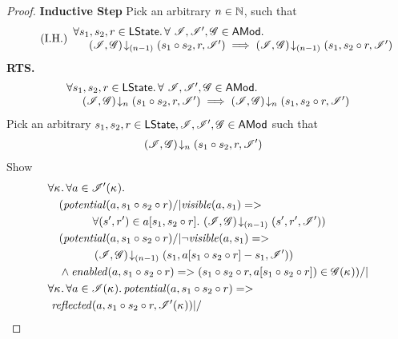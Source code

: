 \begin{lemma}
\begin{proof}
\noindent\textbf{Inductive Step} Pick an arbitrary $n \in \mathbb{N}$, such that
%
\begin{equation}
	\tag{I.H.}
%
	\begin{array}{l}
		\for{s_1, s_2, r \in \LStates} \for{\ \lmod, \lmod', \gmod \in \AMods}\\
		\hspace*{0.5cm} \extendsAMUpto{\lmod, \gmod}{(n-1)}{s_1 \composeL s_2}{r}{\lmod'} \implies 
										\extendsAMUpto{\lmod, \gmod}{(n-1)}{s_1}{s_2 \composeL r}{\lmod'}
	\end{array}
%
\label{LCS:IH}
\end{equation}
%
\textbf{RTS. }
%
\[
\begin{array}{l}
	\forall s_1, s_2, r \in \textsf{LState}.\, \forall \ \mathscr{I}, \mathscr{I}', \mathscr{G} \in \textsf{AMod}.\,\\
	\hspace*{0.5cm} \left(\mathscr{I}, \mathscr{G}\right) \!\downarrow_{n} \left(s_1 \circ s_2, r, \mathscr{I}'\right) \implies 
									\left(\mathscr{I}, \mathscr{G}\right) \!\downarrow_{n} \left(s_1, s_2 \circ r, \mathscr{I}'\right)
\end{array}
\]
%
Pick an arbitrary $s_1, s_2, r \in \textsf{LState}, \mathscr{I}, \mathscr{I}', \mathscr{G} \in \textsf{AMod}$ such that 
%
\begin{align}
	& \left(\mathscr{I}, \mathscr{G}\right) \!\downarrow_{n} \left(s_1 \circ s_2, r, \mathscr{I}'\right) \label{LCS:Ass1}
\end{align}
%
Show
%
\begin{align}
	& 
	\V{\ca{}}  \V{a\in \lmod'(\ca{})} \nonumber \\
  &\quad (\m{potential}(a, s_1 \composeL s_2\composeL r) /| \m{visible}(a, s_1)=> \nonumber\\
  & \qquad \qquad\for{(s', r') \in a[s_1, s_2 \composeL r]} \extendsAMUpto{\lmod, \gmod}{(n-1)}{s'}{r'}{\lmod'}) \label{LCS:Goal0}\\
%  
  &\quad (\m{potential}(a, s_1 \composeL s_2\composeL r) /| \neg\m{visible}(a, s_1)=> \nonumber\\
  & \qquad \qquad \extendsAMUpto{\lmod, \gmod}{(n-1)}{s_1}{a[s_1 \composeL s_2 \composeL r] - s_1}{\lmod'}) \label{LCS:Goal1}\\
%    
  &\quad\land \m{enabled}(a,s_1 \composeL s_2 \composeL r)
  => (s_1 \composeL s_2 \composeL r,
  a[s_1 \composeL s_2 \composeL r])\in \gmod(\ca{}))
  /|\null \label{LCS:Goal2}\\
%  
  &\V{\ca{}}\V{a\in \lmod(\ca{})}
  \m{potential}(a,s_1 \composeL s_2 \composeL r) =>\null \nonumber \\
  &\ \m{reflected}(a,s_1 \composeL s_2 \composeL r,\lmod'(\ca{})) |/\null \nonumber \\

\end{align}
\end{proof}
\end{lemma}
